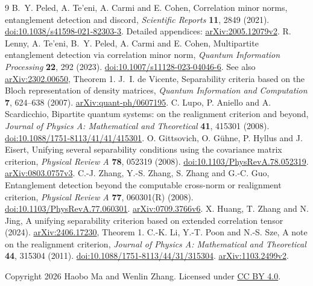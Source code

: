 \documentclass[11pt]{article}
\begin{document}
\begin{thebibliography}{9}
B.~Y. Peled, A. Te'eni, A. Carmi and E. Cohen,
Correlation minor norms, entanglement detection and discord,
\emph{Scientific Reports} \textbf{11}, 2849 (2021).
\href{https://doi.org/10.1038/s41598-021-82303-3}{doi:10.1038/s41598-021-82303-3}.
Detailed appendices: \href{https://arxiv.org/abs/2005.12079v2}{arXiv:2005.12079v2}.
R. Lenny, A. Te'eni, B.~Y. Peled, A. Carmi and E. Cohen,
Multipartite entanglement detection via correlation minor norm,
\emph{Quantum Information Processing} \textbf{22}, 292 (2023).
\href{https://doi.org/10.1007/s11128-023-04046-6}{doi:10.1007/s11128-023-04046-6}.
See also \href{https://arxiv.org/abs/2302.00650}{arXiv:2302.00650}, Theorem 1.
J.~I. de Vicente,
Separability criteria based on the Bloch representation of density matrices,
\emph{Quantum Information and Computation} \textbf{7}, 624--638 (2007).
\href{https://arxiv.org/abs/quant-ph/0607195}{arXiv:quant-ph/0607195}.
C. Lupo, P. Aniello and A. Scardicchio,
Bipartite quantum systems: on the realignment criterion and beyond,
\emph{Journal of Physics A: Mathematical and Theoretical} \textbf{41},
415301 (2008).
\href{https://doi.org/10.1088/1751-8113/41/41/415301}{doi:10.1088/1751-8113/41/41/415301}.
O. Gittsovich, O. G\"uhne, P. Hyllus and J. Eisert,
Unifying several separability conditions using the covariance matrix criterion,
\emph{Physical Review A} \textbf{78}, 052319 (2008).
\href{https://doi.org/10.1103/PhysRevA.78.052319}{doi:10.1103/PhysRevA.78.052319}.
\href{https://arxiv.org/abs/0803.0757v3}{arXiv:0803.0757v3}.
C.-J. Zhang, Y.-S. Zhang, S. Zhang and G.-C. Guo,
Entanglement detection beyond the computable cross-norm or realignment criterion,
\emph{Physical Review A} \textbf{77}, 060301(R) (2008).
\href{https://doi.org/10.1103/PhysRevA.77.060301}{doi:10.1103/PhysRevA.77.060301}.
\href{https://arxiv.org/abs/0709.3766v6}{arXiv:0709.3766v6}.
X. Huang, T. Zhang and N. Jing,
A unifying separability criterion based on extended correlation tensor (2024).
\href{https://arxiv.org/abs/2406.17230}{arXiv:2406.17230}, Theorem 1.
C.-K. Li, Y.-T. Poon and N.-S. Sze,
A note on the realignment criterion,
\emph{Journal of Physics A: Mathematical and Theoretical} \textbf{44},
315304 (2011).
\href{https://doi.org/10.1088/1751-8113/44/31/315304}{doi:10.1088/1751-8113/44/31/315304}.
\href{https://arxiv.org/abs/1103.2499v2}{arXiv:1103.2499v2}.
\end{thebibliography}
\noindent\small Copyright 2026 Haobo Ma and Wenlin Zhang.
Licensed under \href{https://creativecommons.org/licenses/by/4.0/}{CC BY 4.0}.
\end{document}
